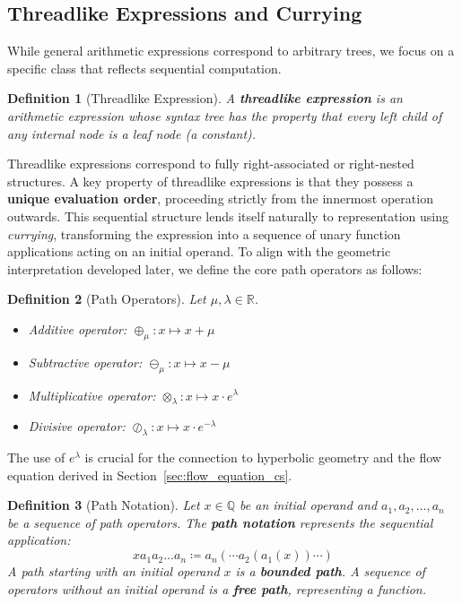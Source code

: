 \documentclass[12pt]{article}
\newtheorem{definition}{Definition}[section]
\begin{document}
\subsection{Threadlike Expressions and Currying}

While general arithmetic expressions correspond to arbitrary trees, we focus on a specific class that reflects sequential computation.

\begin{definition}[Threadlike Expression]\label{def:threadlike_expression_cs}
A \textbf{threadlike expression} is an arithmetic expression whose syntax tree has the property that every left child of any internal node is a leaf node (a constant).
\end{definition}

Threadlike expressions correspond to fully right-associated or right-nested structures. A key property of threadlike expressions is that they possess a \textbf{unique evaluation order}, proceeding strictly from the innermost operation outwards. This sequential structure lends itself naturally to representation using \emph{currying}, transforming the expression into a sequence of unary function applications acting on an initial operand. To align with the geometric interpretation developed later, we define the core path operators as follows:

\begin{definition}[Path Operators]\label{def:path_operators_cs}
Let \( \mu, \lambda \in \mathbb{R} \).
\begin{itemize}
  \item Additive operator: \( \oplus_\mu : x \mapsto x + \mu \)
  \item Subtractive operator: \( \ominus_\mu : x \mapsto x - \mu \)
  \item Multiplicative operator: \( \otimes_\lambda : x \mapsto x \cdot e^\lambda \)
  \item Divisive operator: \( \oslash_\lambda : x \mapsto x \cdot e^{-\lambda} \)
\end{itemize}
\end{definition}
The use of \( e^\lambda \) is crucial for the connection to hyperbolic geometry and the flow equation derived in Section~\ref{sec:flow_equation_cs}.

\begin{definition}[Path Notation]\label{def:path_notation_cs}
Let \( x \in \mathbb{Q} \) be an initial operand and \( a_1, a_2, \dots, a_n \) be a sequence of path operators. The \textbf{path notation} represents the sequential application:
\[
x a_1 a_2 \dots a_n \coloneqq a_n(\cdots a_2(a_1(x)) \cdots)
\]
A path starting with an initial operand \( x \) is a \textbf{bounded path}. A sequence of operators without an initial operand is a \textbf{free path}, representing a function.
\end{definition}
\end{document}

